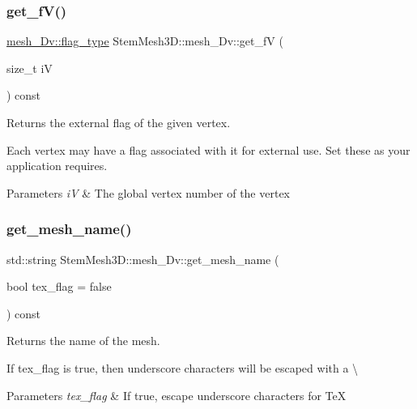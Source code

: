 \subsubsection{\texorpdfstring{get\+\_\+f\+V()}{get\_fV()}}
{\footnotesize\ttfamily \hyperlink{classStemMesh3D_1_1mesh__3Dv_a9544cba555b60f17f04fcd1689314338}{mesh\+\_\+Dv\+::flag\+\_\+type} Stem\+Mesh3\+D\+::mesh\+\_\+Dv\+::get\+\_\+fV (\begin{DoxyParamCaption}\item[{size\+\_\+t}]{iV }\end{DoxyParamCaption}) const}



Returns the external flag of the given vertex. 

Each vertex may have a flag associated with it for external use. Set these as your application requires. 
\begin{DoxyParams}{Parameters}
{\em iV} & The global vertex number of the vertex \\
\hline
\end{DoxyParams}
\mbox{\label{classStemMesh3D_1_1mesh__3Dv_a64769d0a6781ff75ea2a1e603886d80a}} 
\subsubsection{\texorpdfstring{get\+\_\+mesh\+\_\+name()}{get\_mesh\_name()}}
{\footnotesize\ttfamily std\+::string Stem\+Mesh3\+D\+::mesh\+\_\+Dv\+::get\+\_\+mesh\+\_\+name (\begin{DoxyParamCaption}\item[{bool}]{tex\+\_\+flag = {\ttfamily false} }\end{DoxyParamCaption}) const}



Returns the name of the mesh. 

If tex\+\_\+flag is true, then underscore characters will be escaped with a \textbackslash{} 
\begin{DoxyParams}{Parameters}
{\em tex\+\_\+flag} & If true, escape underscore characters for TeX \\
\hline
\end{DoxyParams}
\mbox{\label{classStemMesh3D_1_1mesh__3Dv_a558210d25a3eead99384f039a3419730}} 
